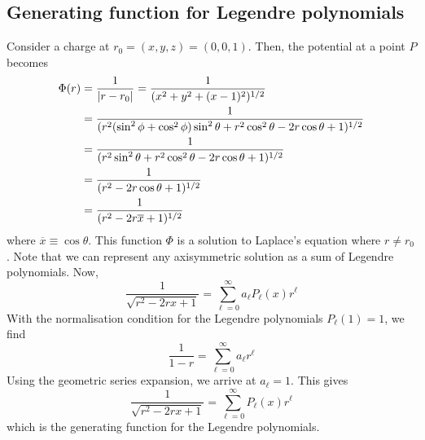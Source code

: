 \subsection{Generating function for Legendre polynomials}
Consider a charge at \( r_0 = (x,y,z) = (0,0,1) \).
Then, the potential at a point \( P \) becomes
\begin{align*}
    \Phi(r) &= \frac{1}{\abs{r - r_0}} = \frac{1}{(x^2 + y^2 + (x-1)^2)^{1/2}} \\
    &= \frac{1}{(r^2 (\sin^2 \phi + \cos^2 \phi) \sin^2 \theta + r^2 \cos^2 \theta - 2r \cos\theta + 1)^{1/2}} \\
    &= \frac{1}{(r^2 \sin^2 \theta + r^2 \cos^2 \theta - 2r \cos\theta + 1)^{1/2}} \\
    &= \frac{1}{(r^2 - 2r \cos\theta + 1)^{1/2}} \\
    &= \frac{1}{(r^2 - 2r \overline x + 1)^{1/2}}
\end{align*}
where \( \overline x \equiv \cos \theta \).
This function \( \Phi \) is a solution to Laplace's equation where \( r \neq r_0 \).
Note that we can represent any axisymmetric solution as a sum of Legendre polynomials.
Now,
\[ \frac{1}{\sqrt{r^2 - 2rx + 1}} = \sum_{\ell = 0}^\infty a_\ell P_\ell(x) r^\ell \]
With the normalisation condition for the Legendre polynomials \( P_\ell(1) = 1 \), we find
\[ \frac{1}{1-r} = \sum_{\ell=0}^\infty a_\ell r^\ell \]
Using the geometric series expansion, we arrive at \( a_\ell = 1 \).
This gives
\[ \frac{1}{\sqrt{r^2 - 2rx + 1}} = \sum_{\ell = 0}^\infty P_\ell(x) r^\ell \]
which is the generating function for the Legendre polynomials.
